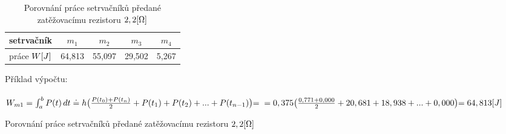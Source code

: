 \documentclass{article}
\begin{document}
\begin{figure}[H]
  \begin{minipage}[t]{\textwidth}
    \begin{table}[H]
      \centering
      \begin{tabular}{|c|c|c|c|c|}
        \hline
        setrvačník	      & \(m_1\)	& \(m_2\)   & \(m_3\) & \(m_4\) \\ \hline
        práce \(W\-[J]\)  & 64,813  & 55,097    & 29,502  & 5,267   \\ \hline
      \end{tabular}
      \caption{\label{tabulka_mereni} Porovnání práce setrvačníků předané zatěžovacímu rezistoru \(2,2\-[\Omega]\) }
    \end{table}
    Příklad výpočtu: \\
    \\
    \large
    \(
      W_{m1} = \int_{a}^{b}P(t) \,dt \doteq  h\bigl(\frac{P(t_0)+P(t_n)}{2}+P(t_1)+P(t_2)+ ... +P(t_{n-1})\bigl) = \\ \\
      = 0,375\bigl(\frac{0,771+0,000}{2}+20,681+18,938+ ... +0,000\bigl) = 64,813\-[J]
    \)
    \normalsize
  \end{minipage}
\end{figure}
\end{document}

